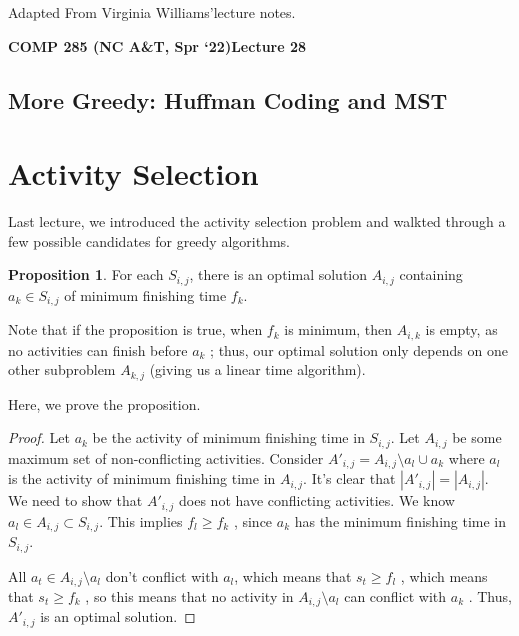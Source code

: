 \documentclass [12pt]{article}
\theoremstyle{definition}
\newtheorem{proposition}{Proposition}
\begin{document}
 

\vspace {1em} 
\begin {Instruction} 
Adapted From Virginia Williams'lecture notes.
\end {Instruction}  

{\LARGE \textbf {COMP 285 (NC A\&T, Spr `22)}\hfill \textbf {Lecture 28} } 

\begin{centering}
\section*{More Greedy: Huffman Coding and MST}
\end{centering}


\section{Activity Selection}

Last lecture, we introduced the activity selection problem and walkted through a few possible candidates for greedy algorithms.

\begin{proposition}
For each $S_{i ,j}$, there is an optimal solution $A_{i ,j}$ containing $a_k \in S_{i ,j}$ of minimum finishing time $f_k$.
\end{proposition}
 

Note that if the proposition is true, when $f_k$ is minimum, then $A_{i ,k}$ is empty, as no activities can finish before $a_k$ ; thus, our optimal solution only depends on one other subproblem $A_{k ,j}$ (giving us a linear time algorithm). 


Here, we prove the proposition.

\begin{proof}

Let $a_k$ be the activity of minimum finishing time in $S_{i ,j}$. Let $A_{i ,j}$ be some maximum set of non-conflicting activities. Consider $A'_{i ,j} = A_{i ,j} \setminus {a_l} \cup {a_k}$ where $a_l$ is the activity of minimum finishing time in $A_{i ,j}$. It's clear that $|A'_{i ,j}| = |A_{i ,j}|$. We need to show that $A'_{i ,j}$ does not have conflicting activities. We know $a_l \in A_{i ,j} \subset S_{i ,j}$. This implies $f_l \geq f_k$ , since $a_k$ has the minimum finishing time in $S_{i ,j}$. 

All $a_t \in A_{i ,j} \setminus {a_l}$ don't conflict with $a_l $, which means that $s_t \geq f_l$ , which means that $s_t \geq f_k$ , so this means that no activity in $A_{i ,j} \setminus {a_l}$ can conflict with $a_k$ . Thus, $A'_{i ,j}$ is an optimal solution.
\end{proof}
\end{document}
